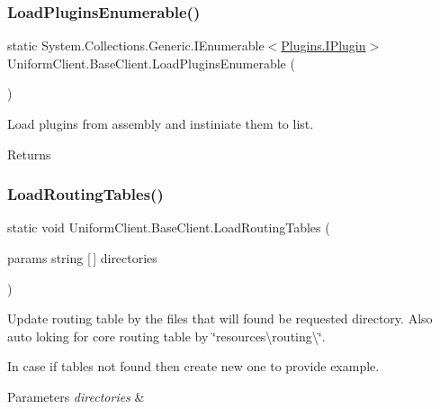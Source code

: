 \subsubsection{\texorpdfstring{Load\+Plugins\+Enumerable()}{LoadPluginsEnumerable()}}
{\footnotesize\ttfamily static System.\+Collections.\+Generic.\+I\+Enumerable$<$\mbox{\hyperlink{interface_uniform_client_1_1_plugins_1_1_i_plugin}{Plugins.\+I\+Plugin}}$>$ Uniform\+Client.\+Base\+Client.\+Load\+Plugins\+Enumerable (\begin{DoxyParamCaption}{ }\end{DoxyParamCaption})\hspace{0.3cm}{\ttfamily [static]}}



Load plugins from assembly and instiniate them to list. 

\begin{DoxyReturn}{Returns}

\end{DoxyReturn}
\mbox{\label{class_uniform_client_1_1_base_client_a5f8f22aa4ab8219fb5f1b6a358f68daf}} 
\subsubsection{\texorpdfstring{Load\+Routing\+Tables()}{LoadRoutingTables()}}
{\footnotesize\ttfamily static void Uniform\+Client.\+Base\+Client.\+Load\+Routing\+Tables (\begin{DoxyParamCaption}\item[{params string \mbox{[}$\,$\mbox{]}}]{directories }\end{DoxyParamCaption})\hspace{0.3cm}{\ttfamily [static]}}



Update routing table by the files that will found be requested directory. Also auto loking for core routing table by \char`\"{}resources\textbackslash{}routing\textbackslash{}\char`\"{}. 

In case if tables not found then create new one to provide example. 


\begin{DoxyParams}{Parameters}
{\em directories} & \\
\hline
\end{DoxyParams}
\mbox{\label{class_uniform_client_1_1_base_client_a0cbf7ac099cc033676f65c1236279811}} 
